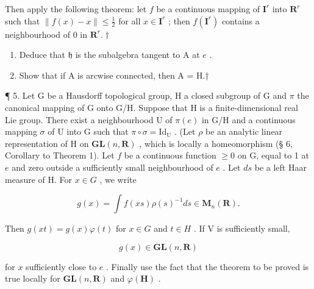 Then apply the following theorem: let \(f\) be a continuous mapping of \(\mathbf{I}^r\) into \(\mathbf{R}^r\) such that \(\| f(x) - x \| \leqslant \frac{1}{2}\) for all \(x \in \mathbf{I}^r\) ; then \(f(\mathbf{I}^r)\) contains a neighbourhood of 0 in \(\mathbf{R}^r. \dagger\)

\begin{enumerate}
\def\labelenumi{(\alph{enumi})}
\setcounter{enumi}{2}
\item
  Deduce that \(\mathfrak{h}\) is the subalgebra tangent to A at \(e\) .
\item
  Show that if A is arcwise connected, then A = H.†
\end{enumerate}

¶ 5. Let G be a Hausdorff topological group, H a closed subgroup of G and \(\pi\) the canonical mapping of G onto G/H. Suppose that H is a finite-dimensional real Lie group. There exist a neighbourhood U of \(\pi(e)\) in G/H and a continuous mapping \(\sigma\) of U into G such that \(\pi \circ \sigma = \mathrm{Id}_{\mathrm{U}}\) . (Let \(\rho\) be an analytic linear representation of H on \(\mathbf{GL}(n,\mathbf{R})\) , which is locally a homeomorphism (§ 6, Corollary to Theorem 1). Let \(f\) be a continuous function \(\geqslant 0\) on G, equal to 1 at \(e\) and zero outside a sufficiently small neighbourhood of \(e\) . Let \(ds\) be a left Haar measure of H. For \(x \in G\) , we write

\[
g (x) = \int f (x s) \rho (s) ^ {- 1} d s \in \mathbf {M} _ {n} (\mathbf {R}).
\]

Then \(g(xt) = g(x)\varphi(t)\) for \(x \in G\) and \(t \in H\) . If V is sufficiently small,

\[
g (x) \in \mathbf {G L} (n, \mathbf {R})
\]

for \(x\) sufficiently close to \(e\) . Finally use the fact that the theorem to be proved is true locally for \(\mathbf{GL}(n, \mathbf{R})\) and \(\varphi(\mathbf{H})\) .

